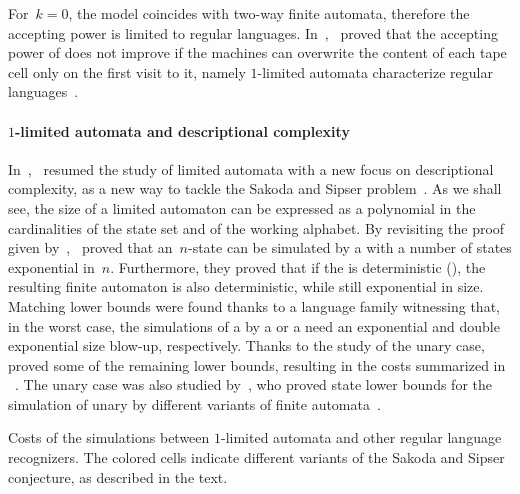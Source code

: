 For~$k=0$, the model coincides with two-way finite automata, therefore the accepting power is limited to regular languages.
In~\citeyear{WagWec86},~\citeauthor{WagWec86} proved that the accepting power of \TNFAs does not improve if the machines can overwrite the content of each tape cell only on the first visit to it, namely $1$-limited automata characterize regular languages~\cite{WagWec86}.

\paragraph{$1$-limited automata and descriptional complexity}
In~\citeyear{PigPis14},~\citeauthor{PigPis14} resumed the study of limited automata with a new focus on descriptional complexity, as a new way to tackle the Sakoda and Sipser problem~\cite{PigPis14}.
As we shall see, the size of a limited automaton can be expressed as a polynomial in the cardinalities of the state set and of the working alphabet.
By revisiting the proof given by~\citeauthor{WagWec86},~\citeauthor{PigPis14} proved that an~$n$-state \OLA can be simulated by a \ONFA with a number of states exponential in~$n$.
Furthermore, they proved that if the \OLA is deterministic (\ODLA), the resulting finite automaton is also deterministic, while still exponential in size.
Matching lower bounds were found thanks to a language family witnessing that, in the worst case, the simulations of a \OLA by a \ONFA or a \ODFA need an exponential and double exponential size blow-up, respectively.
Thanks to the study of the unary case,~\citeauthor{PigPri19} proved some of the remaining lower bounds, resulting in the costs summarized in ~\cite{PigPri19}.
The unary case was also studied by~\citeauthor{KutWen15}, who proved state lower bounds for the simulation of unary \kLA by different variants of finite automata~\cite{KutWen15}.

\begin{table}
	\centering
	\caption[Costs of the simulations between $1$-limited automata and other regular language recognizers.]{Costs of the simulations between $1$-limited automata and other regular language recognizers.
		The colored cells indicate different variants of the Sakoda and Sipser conjecture, as described in the text.}
	\label{tab:sims-1la-general-context}
\end{table}

